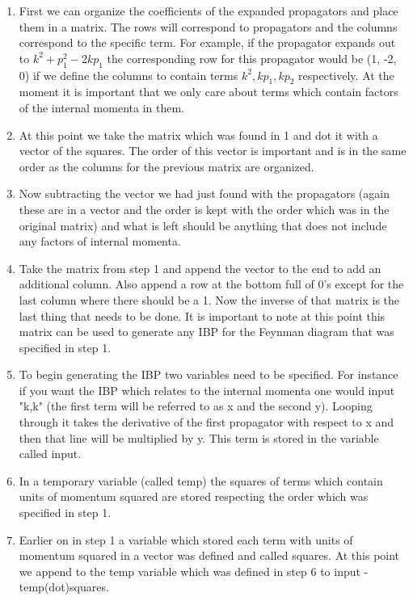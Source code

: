 \documentclass[preprintnumbers,superscriptaddress,nofootinbib,aps,prd,floatfix]{revtex4}
\begin{document}
\begin{center}
\begin{enumerate}
\item First we can organize the coefficients of the expanded propagators and place them in a matrix. The rows will correspond to propagators and the columns correspond to the specific term. For example, if the propagator expands out to $k^2 + p_1^2 - 2kp_1$ the corresponding row for this propagator would be (1, -2, 0) if we define the columns to contain terms $k^2, kp_1, kp_2$ respectively. At the moment it is important that we only care about terms which contain factors of the internal momenta in them. 
\item At this point we take the matrix which was found in 1 and dot it with a vector of the squares. The order of this vector is important and is in the same order as the columns for the previous matrix are organized. 
\item Now subtracting the vector we had just found with the propagators (again these are in a vector and the order is kept with the order which was in the original matrix) and what is left should be anything that does not include any factors of internal momenta.
\item Take the matrix from step 1 and append the vector to the end to add an additional column. Also append a row at the bottom full of 0's except for the last column where there should be a 1. Now the inverse of that matrix is the last thing that needs to be done. It is important to note at this point this matrix can be used to generate any IBP for the Feynman diagram that was specified in step 1. 
\item To begin generating the IBP two variables need to be specified. For instance if you want the IBP which relates to the internal momenta one would input "k,k" (the first term will be referred to as x and the second y). Looping through it takes the derivative of the first propagator with respect to x and then that line will be multiplied by y. This term is stored in the variable called input.
\item In a temporary variable (called temp) the squares of terms which contain units of momentum squared are stored respecting the order which was specified in step 1. 
\item Earlier on in step 1 a variable which stored each term with units of momentum squared in a vector was defined and called squares. At this point we append to the temp variable which was defined in step 6 to input - temp(dot)squares.

\end{enumerate}
\end{center}
\end{document}
